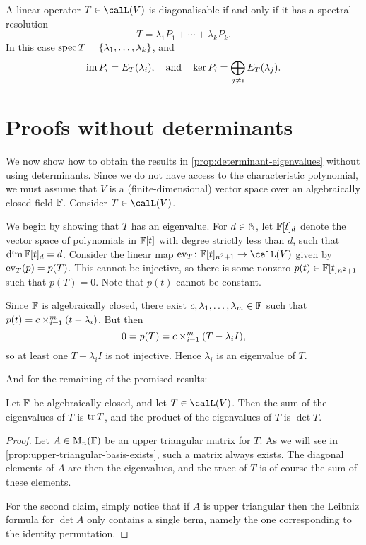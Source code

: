 \begin{propositionnoproof}
    A linear operator $T \in \lin(V)$ is diagonalisable if and only if it has a spectral resolution
    \begin{equation*}
        T
            = \lambda_1 P_1 + \cdots + \lambda_k P_k.
    \end{equation*}
    In this case $\operatorname{spec} T = \{\lambda_1, \ldots, \lambda_k\}$, and
    \begin{equation*}
        \operatorname{im} P_i = E_T(\lambda_i),
        \quad \text{and} \quad
        \ker P_i = \bigoplus_{j \neq i} E_T(\lambda_j).
    \end{equation*}
\end{propositionnoproof}


\section{Proofs without determinants}

We now show how to obtain the results in \cref{prop:determinant-eigenvalues} without using determinants. Since we do not have access to the characteristic polynomial, we must assume that $V$ is a (finite-dimensional) vector space over an algebraically closed field $\mathbb{F}$. Consider $T \in \lin(V)$.


We begin by showing that $T$ has an eigenvalue. For $d \in \mathbb{N}$, let $\mathbb{F}[t]_d$ denote the vector space of polynomials in $\mathbb{F}[t]$ with degree strictly less than $d$, such that $\dim \mathbb{F}[t]_d = d$. Consider the linear map $\ev_T \colon \fieldF[t]_{n^2+1} \to \lin(V)$ given by $\mathrm{ev}_T(p) = p(T)$. This cannot be injective, so there is some nonzero $p(t) \in \mathbb{F}[t]_{n^2+1}$ such that $p(T) = 0$. Note that $p(t)$ cannot be constant.

Since $\mathbb{F}$ is algebraically closed, there exist $c, \lambda_1, \ldots, \lambda_m \in \mathbb{F}$ such that $p(t) = c \bigprod_{i=1}^m (t - \lambda_i)$. But then
%
\begin{equation*}
    0
        = p(T)
        = c \bigprod_{i=1}^m (T - \lambda_i I),
\end{equation*}
%
so at least one $T - \lambda_i I$ is not injective. Hence $\lambda_i$ is an eigenvalue of $T$.


And for the remaining of the promised results:

\begin{corollary}
    Let $\mathbb{F}$ be algebraically closed, and let $T \in \lin(V)$. Then the sum of the eigenvalues of $T$ is $\operatorname{tr} T$, and the product of the eigenvalues of $T$ is $\det T$.
\end{corollary}

\begin{proof}
    Let $A \in \mathrm{M}_{n}(\mathbb{F})$ be an upper triangular matrix for $T$. As we will see in \cref{prop:upper-triangular-basis-exists}, such a matrix always exists. The diagonal elements of $A$ are then the eigenvalues, and the trace of $T$ is of course the sum of these elements.

    For the second claim, simply notice that if $A$ is upper triangular then the Leibniz formula for $\det A$ only contains a single term, namely the one corresponding to the identity permutation.
\end{proof}